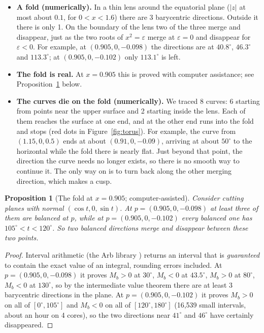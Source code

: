 \documentclass[11pt]{article}
\theoremstyle{plain}
\newtheorem{proposition}[lemma]{Proposition}
\theoremstyle{definition}
\theoremstyle{remark}
\begin{document}
\begin{itemize}
\item \textbf{A fold (numerically).} In a thin lens around the equatorial plane ($|z|$ at most about $0.1$, for $0<x<1.6$) there are 3 barycentric directions. Outside it there is only 1. On the boundary of the lens two of the three merge and disappear, just as the two roots of $x^2=\varepsilon$ merge at $\varepsilon=0$ and disappear for $\varepsilon<0$. For example, at $(0.905,0,-0.098)$ the directions are at $40.8^\circ$, $46.3^\circ$ and $113.3^\circ$; at $(0.905,0,-0.102)$ only $113.1^\circ$ is left.
\item \textbf{The fold is real.} At $x=0.905$ this is proved with computer assistance; see Proposition~\ref{prop:fold} below.
\item \textbf{The curves die on the fold (numerically).} We traced 8 curves: 6 starting from points near the upper surface and 2 starting inside the lens. Each of them reaches the surface at one end, and at the other end runs into the fold and stops (red dots in Figure~\ref{fig:torus}). For example, the curve from $(1.15,0,0.5)$ ends at about $(0.91,0,-0.09)$, arriving at about $50^\circ$ to the horizontal while the fold there is nearly flat. Just beyond that point, the direction the curve needs no longer exists, so there is no smooth way to continue it. The only way on is to turn back along the other merging direction, which makes a cusp.
\end{itemize}

\begin{proposition}[The fold at $x=0.905$; computer-assisted]\label{prop:fold}
Consider cutting planes with normal $(\cos t,0,\sin t)$. At $p=(0.905,0,-0.098)$ at least three of them are balanced at $p$, while at $p=(0.905,0,-0.102)$ every balanced one has $105^\circ<t<120^\circ$. So two balanced directions merge and disappear between these two points.
\end{proposition}
\begin{proof}
Interval arithmetic (the Arb library \cite{arb}) returns an interval that is \emph{guaranteed} to contain the exact value of an integral, rounding errors included. At $p=(0.905,0,-0.098)$ it proves $M_b>0$ at $30^\circ$, $M_b<0$ at $43.5^\circ$, $M_b>0$ at $80^\circ$, $M_b<0$ at $130^\circ$, so by the intermediate value theorem there are at least 3 barycentric directions in the plane. At $p=(0.905,0,-0.102)$ it proves $M_b>0$ on all of $[0^\circ,105^\circ]$ and $M_b<0$ on all of $[120^\circ,180^\circ]$ (16{,}539 small intervals, about an hour on 4 cores), so the two directions near $41^\circ$ and $46^\circ$ have certainly disappeared.
\end{proof}
\end{document}
